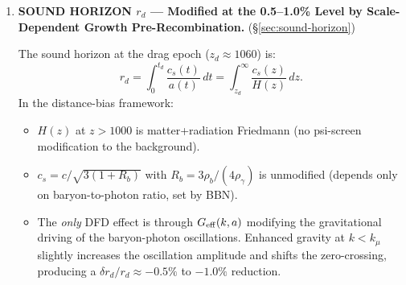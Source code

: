 \documentclass[11pt,a4paper]{article}
\newcommand{\LCDM}{$\Lambda$CDM}
\newcommand{\Geff}{G_{\rm eff}}
\newcommand{\Dpsi}{\Delta\psi}
\begin{document}
\begin{tcolorbox}[colback=yellow!5!white, colframe=red!70!black,
  title=\textbf{W4i15 TOP 5 FINDINGS --- RANKED BY IMPACT}]
\begin{enumerate}
  In the DFD distance-bias framework, the psi-screen is built from
  accumulated $\delta\psi$ perturbations along the line of sight.
  At the BBN epoch ($z \sim 10^9$, $T \sim 1$~MeV):
  \begin{itemize}[nosep]
  \item The homogeneous DFD field equation has $\nabla\psi = 0$,
    $\rho = \bar{\rho}$ --- both sides vanish.  No background
    psi-field evolution.
  \item Perturbations $\delta\psi$ are $\sim 10^{-5}$ (sourced by
    the same density perturbations as in \LCDM).
  \item The psi-screen monopole $\langle\Dpsi(z)\rangle$ at
    $z \sim 10^9$ is $\sim \Dpsi_0 \times g(z \to \infty) \approx
    0.36$--$0.40$, but this is a \emph{distance bias}, not a
    modification of local physics.
  \item Nuclear reaction rates, the neutron-to-proton ratio, and
    the freeze-out temperature are governed by local microphysics
    and the local expansion rate $H(T)$.  In DFD, the local
    expansion rate at BBN is standard (matter + radiation
    Friedmann, with no psi-screen correction to local clock rates
    at the homogeneous level).
  \end{itemize}

  \textbf{Result}: DFD predicts standard BBN abundances
  ($Y_p = 0.2470 \pm 0.0002$, D/H $= (2.57 \pm 0.03) \times
  10^{-5}$) identical to \LCDM.  No tension with Planck or
  direct abundance measurements.

  \textbf{Caveat}: If the ``evolving constants'' mechanism of
  v3.2 Section 12.10 is invoked (where $\alpha_{\rm EM}$ or $G$
  vary with the background $\psi_0$), BBN becomes a nontrivial
  constraint.  This mechanism is speculative and not part of the
  core DFD prediction.

\item \textbf{SOUND HORIZON $r_d$ --- Modified at the 0.5--1.0\% Level
  by Scale-Dependent Growth Pre-Recombination.}
  (\S\ref{sec:sound-horizon})

  The sound horizon at the drag epoch ($z_d \approx 1060$) is:
  \[
  r_d = \int_0^{t_d} \frac{c_s(t)}{a(t)}\,dt
  = \int_{z_d}^\infty \frac{c_s(z)}{H(z)}\,dz.
  \]
  In the distance-bias framework:
  \begin{itemize}[nosep]
  \item $H(z)$ at $z > 1000$ is matter+radiation Friedmann
    (no psi-screen modification to the background).
  \item $c_s = c/\sqrt{3(1 + R_b)}$ with $R_b = 3\rho_b/(4\rho_\gamma)$
    is unmodified (depends only on baryon-to-photon ratio, set by BBN).
  \item The \emph{only} DFD effect is through $\Geff(k,a)$ modifying
    the gravitational driving of the baryon-photon oscillations.
    Enhanced gravity at $k < k_\mu$ slightly increases the oscillation
    amplitude and shifts the zero-crossing, producing a
    $\delta r_d / r_d \approx -0.5\%$ to $-1.0\%$ reduction.
  \end{itemize}


\end{enumerate}
\end{tcolorbox}
\end{document}
